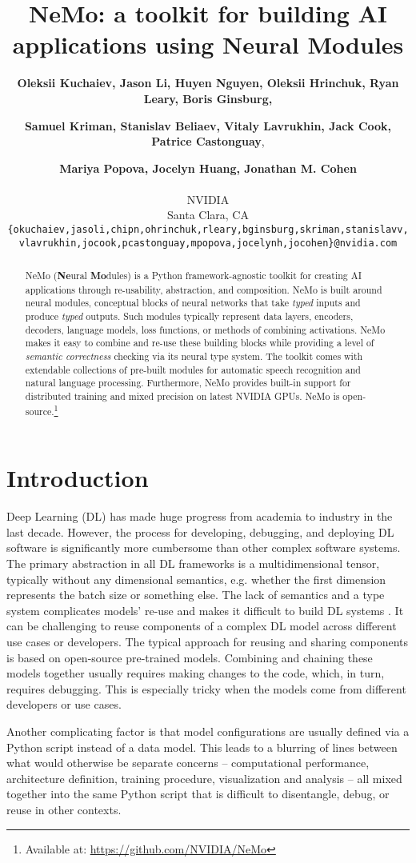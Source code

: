 \documentclass{article}
\title{NeMo: a toolkit for building AI applications using Neural Modules}
\author{
 \textbf{Oleksii Kuchaiev, Jason Li, Huyen Nguyen, Oleksii Hrinchuk, Ryan Leary, Boris Ginsburg,} \and \textbf{Samuel Kriman, Stanislav Beliaev, Vitaly Lavrukhin, Jack Cook, Patrice Castonguay}, \and \textbf{Mariya Popova, Jocelyn Huang, Jonathan M. Cohen} \\ \\ NVIDIA \\ Santa Clara, CA \\
 \texttt{\{okuchaiev,jasoli,chipn,ohrinchuk,rleary,bginsburg,skriman,stanislavv,} \\
 \texttt{vlavrukhin,jocook,pcastonguay,mpopova,jocelynh,jocohen\}@nvidia.com}
 }
\begin{document}
\maketitle

\begin{abstract}
NeMo (\textbf{Ne}ural \textbf{Mo}dules) is a Python framework-agnostic toolkit for creating AI applications through re-usability, abstraction, and composition. NeMo is built around neural modules, conceptual blocks of neural networks that take \textit{typed} inputs and produce \textit{typed} outputs. Such modules typically represent data layers, encoders, decoders, language models, loss functions, or methods of combining activations. NeMo makes it easy to combine and re-use these building blocks while providing a level of \textit{semantic correctness} checking via its neural type system. The toolkit comes with extendable collections of pre-built modules for automatic speech recognition  and natural language processing. Furthermore, NeMo provides built-in support for distributed training and mixed precision on latest NVIDIA GPUs. NeMo is open-source.\footnote{Available at: \url{https://github.com/NVIDIA/NeMo}}
\end{abstract}

\section{Introduction}
Deep Learning (DL) has made huge progress from academia to industry in the last decade. However, the process for developing, debugging, and deploying DL software is significantly more cumbersome than other complex software systems. The primary abstraction in all DL frameworks is a multidimensional tensor, typically without any dimensional semantics, e.g. whether the first dimension represents the batch size or something else. The lack of semantics and a type system complicates models' re-use and makes it difficult to build DL systems \citep{namedtensor}. It can be challenging to reuse components of a complex DL model across different use cases or developers. The typical approach for reusing and sharing components is based on open-source pre-trained models. Combining and chaining these models together usually requires making changes to the code, which, in turn, requires debugging. This is especially tricky when the models come from different developers or use cases.

Another complicating factor is that model configurations are usually defined via a Python script instead of a data model. This leads to a blurring of lines between what would otherwise be separate concerns -- computational performance, architecture definition, training procedure, visualization and analysis -- all mixed together into the same Python script that is difficult to disentangle, debug, or reuse in other contexts.
\end{document}

